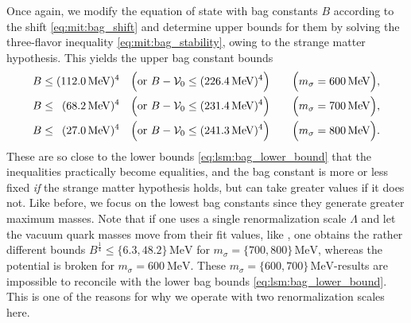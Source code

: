Once again, we modify the equation of state with bag constants $B$ according to the shift \eqref{eq:mit:bag_shift}
and determine upper bounds for them by solving the three-flavor inequality \eqref{eq:mit:bag_stability}, owing to the strange matter hypothesis.
This yields the upper bag constant bounds
\begin{subequations}
\begin{align}
	B \leq (\SI{112.0}{\mega\electronvolt})^4           \quad \Big(\text{or } B-\mathcal{V}_0 \leq (\SI{226.4}{\mega\electronvolt})^4\Big) \qquad \Big(m_\sigma = \SI{600}{\mega\electronvolt}\Big), \label{eq:lsm3f:bag_upper_bound_600} \\
	B \leq \phantom{0}(\SI{68.2}{\mega\electronvolt})^4 \quad \Big(\text{or } B-\mathcal{V}_0 \leq (\SI{231.4}{\mega\electronvolt})^4\Big) \qquad \Big(m_\sigma = \SI{700}{\mega\electronvolt}\Big), \label{eq:lsm3f:bag_upper_bound_700} \\
	B \leq \phantom{0}(\SI{27.0}{\mega\electronvolt})^4 \quad \Big(\text{or } B-\mathcal{V}_0 \leq (\SI{241.3}{\mega\electronvolt})^4\Big) \qquad \Big(m_\sigma = \SI{800}{\mega\electronvolt}\Big). \label{eq:lsm3f:bag_upper_bound_800}
\end{align}%
\label{eq:lsm3f:bag_upper_bound}%
\end{subequations}%
These are so close to the lower bounds \eqref{eq:lsm:bag_lower_bound} that the inequalities practically become equalities,
and the bag constant is more or less fixed \emph{if} the strange matter hypothesis holds, but can take greater values if it does not.
Like before, we focus on the lowest bag constants since they generate greater maximum masses.
Note that if one uses a single renormalization scale $\Lambda$ and let the vacuum quark masses move from their fit values,
like \cite{ref:master_berge},
one obtains the rather different bounds $B^\frac14 \leq \{6.3,48.2\} \, \si{\mega\electronvolt}$ for $m_\sigma=\{700,800\}\,\si{\mega\electronvolt}$,
whereas the potential is broken for $m_\sigma=\SI{600}{\mega\electronvolt}$.
These $m_\sigma=\{600,700\}\,\si{\mega\electronvolt}$-results
are impossible to reconcile with the lower bag bounds \eqref{eq:lsm:bag_lower_bound}.
This is one of the reasons for why we operate with two renormalization scales here.

